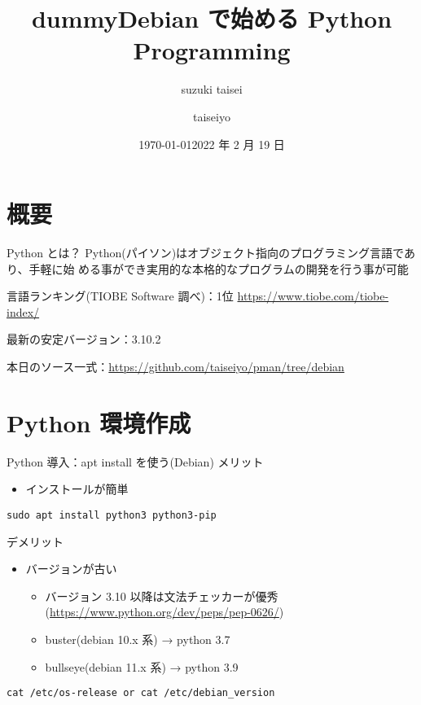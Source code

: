 \documentclass[compress,dvipdfmx,11pt]{beamer}
\author{suzuki taisei}
\date{\today}
\title{dummy}
\title[2022 年度 2 月 Debian 勉強会]{\bf Debian で始める Python Programming}
\author[]{taiseiyo}
\institute{Mail Address: taiseiyo11@gmail.com}
\date{2022 年 2 月 19 日}
\begin{document}
\maketitle
\newcommand{\pivec}{\mathbf \pi}
\newcommand{\xvec}{\mathbf x}
\newcommand{\yvec}{\mathbf y}
\newcommand{\zvec}{\mathbf z}
\newcommand{\Emat}{\mathbf E}
\newcommand{\Imat}{\mathbf I}

\section{概要}
\label{sec:orgd6258a1}
\begin{frame}[label={sec:orge39e6a9}]{Python とは？}
Python(パイソン)はオブジェクト指向のプログラミング言語であり、手軽に始
める事ができ実用的な本格的なプログラムの開発を行う事が可能


言語ランキング(TIOBE Software 調べ)：1位
\url{https://www.tiobe.com/tiobe-index/}


最新の安定バージョン：3.10.2


本日のソース一式：\url{https://github.com/taiseiyo/pman/tree/debian}
\end{frame}

\section{Python 環境作成}
\label{sec:orgc70a84c}
\begin{frame}[label={sec:orgfb28f47},fragile]{Python 導入：apt install を使う(Debian)}
 メリット
\begin{itemize}
\item インストールが簡単
\end{itemize}
\begin{verbatim}
sudo apt install python3 python3-pip
\end{verbatim}

デメリット
\begin{itemize}
\item バージョンが古い
\begin{itemize}
\item バージョン 3.10 以降は文法チェッカーが優秀(\url{https://www.python.org/dev/peps/pep-0626/})
\item buster(debian 10.x 系) → python 3.7
\item bullseye(debian 11.x 系) → python 3.9
\end{itemize}
\end{itemize}


\vspace{-2truemm}      
\begin{verbatim}
cat /etc/os-release or cat /etc/debian_version
\end{verbatim}
\end{frame}
\end{document}
